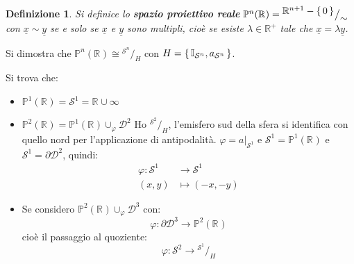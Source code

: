 \documentclass[10pt, twoside=false, x11names]{scrbook}
\newtheorem{definition}[theorem]{Definizione}
\newcommand{\RN}[1][]{\mathbb{R}^#1}
\newcommand{\Id}[1][]{\mathbb{I}_#1}
\newcommand{\Sph}[1][]{\mathcal{S}^#1}
\newcommand{\Disk}[1][]{\mathcal{D}^#1}
\newcommand*\quot[2]{{^{\textstyle #1}\big/_{\textstyle #2}}}
\renewcommand{\vec}[1]{\underline{#1}}
\let\phi\varphi
\let\setminus-
\begin{document}
\begin{definition}
  Si definice lo \textbf{spazio proiettivo reale} $ \mathbb{P}^n(\RN{}) = \quot{\RN{n+1} \setminus \set{0}}{\sim} $
  con $ \vec{x} \sim \vec{y} $ se e solo se $ \vec{x} $ e $ \vec{y} $ sono multipli,
  cioè se esiste $ \lambda \in \RN{+} $ tale che $ \vec{x} = \lambda \vec{y} $.
\end{definition}

Si dimostra che $ \mathbb{P}^n(\RN{}) \cong \quot{\Sph{n}}{H} $ con $ H = \set{\Id{\Sph{n}}, a_{\Sph{n}}} $.

Si trova che:
\begin{itemize}
\item $ \mathbb{P}^1(\RN{}) = \Sph{1} = \RN{} \cup {\infty} $
\item $ \mathbb{P}^2(\RN{}) = \mathbb{P}^1(\RN{}) \cup_\phi \Disk{2} $
  Ho $ \quot{\Sph{2}}{H} $, l'emisfero sud della sfera si identifica con quello
  nord per l'applicazione di antipodalità.
  $ \phi = a \big \lvert_{\Sph{1}} $ e $ \Sph{1} = \mathbb{P}^1(\RN{}) $ e $ \Sph{1} = \partial \Disk{2} $,
  quindi:
  \begin{align*}
    \phi \colon \Sph{1} & \to \Sph{1} \\
    (x,y) & \mapsto (-x,-y)
  \end{align*}
\item Se considero $ \mathbb{P}^2(\RN{}) \cup_\phi \Disk{3} $ con:
  \[
    \phi \colon \partial \Disk{3}  \to \mathbb{P}^2(\RN{})
  \]
  cioè il passaggio al quoziente:
  \[
    \phi \colon \Sph{2}  \to \quot{\Sph{1}}{H}
  \]
\end{itemize}
\end{document}
